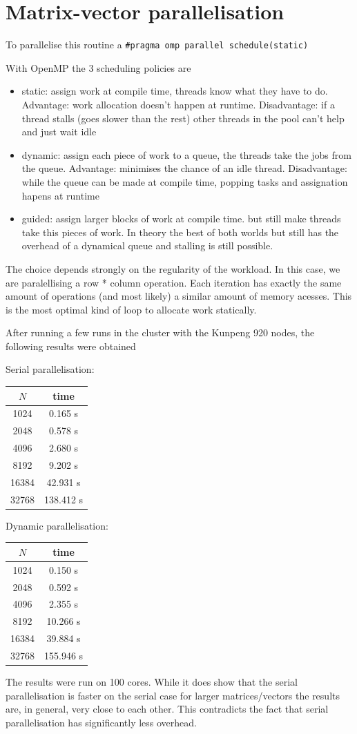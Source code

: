 \documentclass{article}
\begin{document}
\newpage

\section{Matrix-vector parallelisation}
To parallelise this routine a \texttt{\#pragma omp parallel schedule(static)}

With OpenMP the 3 scheduling policies are
\begin{itemize}
  \item static: assign work at compile time, threads know what they have to do. Advantage: work allocation doesn't happen at runtime. Disadvantage: if a thread stalls (goes slower than the rest) other threads in the pool can't help and just wait idle
  \item dynamic: assign each piece of work to a queue, the threads take the jobs from the queue. Advantage: minimises the chance of an idle thread. Disadvantage: while the queue can be made at compile time, popping tasks and assignation hapens at runtime
  \item guided: assign larger blocks of work at compile time. but still make threads take this pieces of work. In theory the best of both worlds but still has the overhead of a dynamical queue and stalling is still possible.
\end{itemize}

The choice depends strongly on the regularity of the workload. In this case, we are paralellising a row * column operation. Each iteration has exactly the same amount of operations (and most likely) a similar amount of memory acesses.
This is the most optimal kind of loop to allocate work statically.

After running a few runs in the cluster with the Kunpeng 920 nodes, the following results were obtained

Serial parallelisation:
    \begin{tabular}{|c|c}
          $N$ & time \\
         \hline
          1024 & 0.165 s \\
          2048 & 0.578 s \\
          4096 &  2.680 s \\
         8192 &  9.202 s  \\
         16384 & 42.931 s \\
         32768 & 138.412 s  \\
    \end{tabular}

Dynamic parallelisation:
    \begin{tabular}{|c|c}
          $N$ & time \\
         \hline
          1024 & 0.150 s \\
          2048 & 0.592 s \\
          4096 &  2.355 s \\
         8192 &  10.266 s  \\
         16384 & 39.884 s \\
         32768 &  155.946 s  \\
    \end{tabular}

The results were run on 100 cores. While it does show that the serial parallelisation is faster on the serial case for larger matrices/vectors
the results are, in general, very close to each other. This contradicts the fact that serial parallelisation has significantly less overhead.
\end{document}
